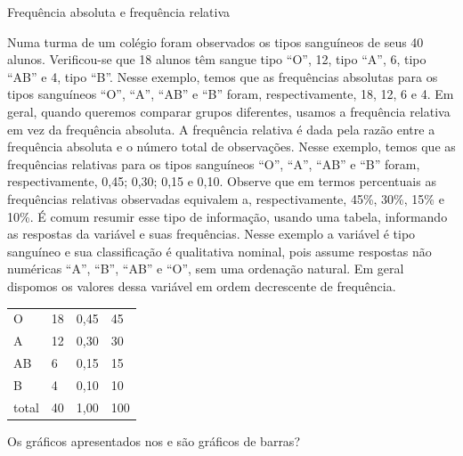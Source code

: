 \begin{example}{Frequência absoluta e frequência relativa}

Numa turma de um colégio foram observados os tipos sanguíneos de seus 40 alunos. Verificou-se que 18 alunos têm sangue tipo ``O'', 12, tipo ``A'', 6, tipo ``AB'' e 4, tipo ``B''. Nesse exemplo, temos que as frequências absolutas para os tipos sanguíneos ``O'', ``A'', ``AB'' e ``B'' foram, respectivamente, 18, 12, 6 e 4. Em geral, quando queremos comparar grupos diferentes, usamos a frequência relativa em vez da frequência absoluta. A frequência relativa é dada pela razão entre a frequência absoluta e o número total de observações. Nesse exemplo, temos que as frequências relativas para os tipos sanguíneos ``O'', ``A'', ``AB'' e ``B'' foram, respectivamente, 0,45; 0,30; 0,15 e 0,10. Observe que em termos percentuais as frequências relativas observadas equivalem a, respectivamente, 45\%, 30\%, 15\% e 10\%.
É comum resumir esse tipo de informação, usando uma tabela, informando as respostas da variável e suas frequências. Nesse exemplo a variável é tipo sanguíneo e sua classificação é qualitativa nominal, pois assume respostas não numéricas ``A'', ``B'', ``AB'' e ``O'', sem uma ordenação natural. Em geral dispomos os valores dessa variável em ordem decrescente de frequência.


\begin{savenotes}\sphinxattablestart
\centering
\begin{tabulary}{\linewidth}[t]{|T|T|T|T|}
\hline
{}\relax &\relax &\relax &\relax \\
\hline
O
&
18
&
0,45
&
45
\\
\hline
A
&
12
&
0,30
&
30
\\
\hline
AB
&
6
&
0,15
&
15
\\
\hline
B
&
4
&
0,10
&
10
\\
\hline
total
&
40
&
1,00
&
100
\\
\hline
\end{tabulary}
\par
\sphinxattableend\end{savenotes}
\end{example}

Os gráficos apresentados nos {\hyperref[\detokenize{PE103-0:fig-infografico-pnad-1}]{}} e {\hyperref[\detokenize{PE103-0:fig-infografico-pnad-2}]{}} são gráficos de barras?

